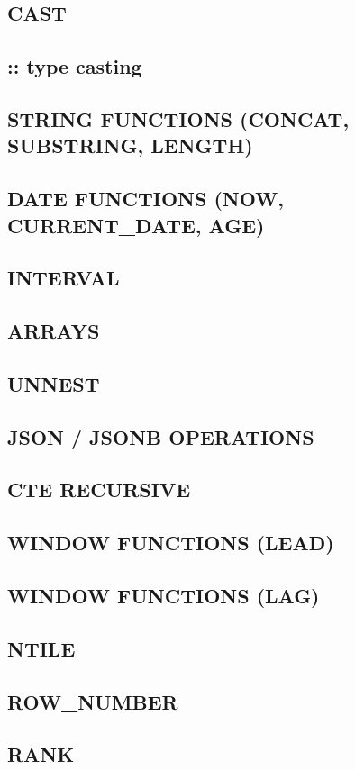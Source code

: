\documentclass[10pt]{article}
\begin{document}
\subsection{CAST}
\subsection{:: type casting}
\subsection{STRING FUNCTIONS (CONCAT, SUBSTRING, LENGTH)}
\subsection{DATE FUNCTIONS (NOW, CURRENT\_DATE, AGE)}
\subsection{INTERVAL}
\subsection{ARRAYS}
\subsection{UNNEST}
\subsection{JSON / JSONB OPERATIONS}
\subsection{CTE RECURSIVE}
\subsection{WINDOW FUNCTIONS (LEAD)}
\subsection{WINDOW FUNCTIONS (LAG)}
\subsection{NTILE}
\subsection{ROW\_NUMBER}
\subsection{RANK}
\end{document}
